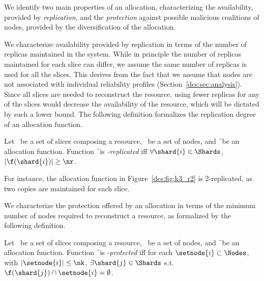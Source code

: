 We identify two main properties of an allocation, characterizing the
availability, provided by {\em replication}, and the {\em protection}
against possible malicious coalitions of nodes, provided by the
diversification of the allocation.

We characterize availability provided by replication in terms of the
number of replicas maintained in the system. While in principle the
number of replicas maintained for each slice can differ, we assume the
same number of replicas is used for all the slices. This derives from
the fact that we assume that nodes are not associated with individual
reliability profiles (Section~\ref{dcs:sec:analysis}).  Since all slices
are needed to reconstruct the resource, using fewer replicas for any
of the slices would decrease the availability of the resource, which
will be dictated by such a lower bound.  The following definition
formalizes the replication degree of an allocation function.

\smallskip
\begin{definition}
Let \Shards\ be a set of slices composing a resource, \Nodes\ be a set
of nodes, and \f\ be an allocation function. Function \f\ is {\em
  \nr-replicated} iff $\forall \shard{i}\in\Shards$, $|\f(\shard{i})|
\geq \nr$.
\end{definition}
\smallskip

For instance, the allocation function in Figure~\ref{dcs:fig:k3_r2} is
2-replicated, as two copies are maintained for each slice.

We characterize the protection offered by an allocation in terms of
the minimum number of nodes required to reconstruct a resource, as
formalized by the following definition.

\smallskip
\begin{definition}
Let \Shards\ be a set of slices composing a resource, \Nodes\ be a set
of nodes, and \f\ be an allocation function. Function \f\ is {\em
  \nk-protected} iff for each $\setnode{i} \subset \Nodes$, with
$|\setnode{i}| \leq \nk$, $\exists \shard{j} \in \Shards$
s.t. $\f(\shard{j})\cap\setnode{i}=\emptyset$.
\end{definition}
\smallskip

